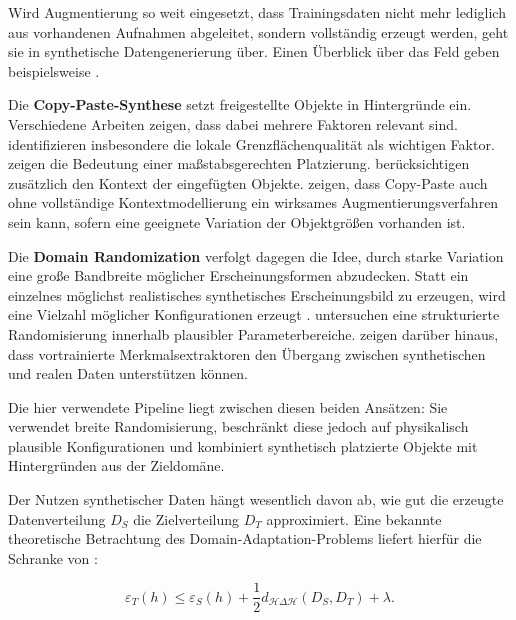 Wird Augmentierung so weit eingesetzt, dass Trainingsdaten nicht mehr lediglich aus vorhandenen Aufnahmen abgeleitet, sondern vollständig erzeugt werden, geht sie in synthetische Datengenerierung über. Einen Überblick über das Feld geben beispielsweise \textcite{nikolenko2021}.

Die \textbf{Copy-Paste-Synthese} setzt freigestellte Objekte in Hintergründe ein. Verschiedene Arbeiten zeigen, dass dabei mehrere Faktoren relevant sind. \textcite{dwibedi2017} identifizieren insbesondere die lokale Grenzflächenqualität als wichtigen Faktor. \textcite{georgakis2017} zeigen die Bedeutung einer maßstabsgerechten Platzierung. \textcite{dvornik2018} berücksichtigen zusätzlich den Kontext der eingefügten Objekte. \textcite{ghiasi2021} zeigen, dass Copy-Paste auch ohne vollständige Kontextmodellierung ein wirksames Augmentierungsverfahren sein kann, sofern eine geeignete Variation der Objektgrößen vorhanden ist.

Die \textbf{Domain Randomization} verfolgt dagegen die Idee, durch starke Variation eine große Bandbreite möglicher Erscheinungsformen abzudecken. Statt ein einzelnes möglichst realistisches synthetisches Erscheinungsbild zu erzeugen, wird eine Vielzahl möglicher Konfigurationen erzeugt \parencite{tobin2017,tremblay2018}. \textcite{prakash2019} untersuchen eine strukturierte Randomisierung innerhalb plausibler Parameterbereiche. \textcite{hinterstoisser2018} zeigen darüber hinaus, dass vortrainierte Merkmalsextraktoren den Übergang zwischen synthetischen und realen Daten unterstützen können.

Die hier verwendete Pipeline liegt zwischen diesen beiden Ansätzen: Sie verwendet breite Randomisierung, beschränkt diese jedoch auf physikalisch plausible Konfigurationen und kombiniert synthetisch platzierte Objekte mit Hintergründen aus der Zieldomäne.


Der Nutzen synthetischer Daten hängt wesentlich davon ab, wie gut die erzeugte Datenverteilung $D_S$ die Zielverteilung $D_T$ approximiert. Eine bekannte theoretische Betrachtung des Domain-Adaptation-Problems liefert hierfür die Schranke von \textcite{bendavid2010}:

\begin{equation}
\varepsilon_T(h)
\leq
\varepsilon_S(h)
+
\frac{1}{2}
d_{\mathcal{H}\Delta\mathcal{H}}(D_S,D_T)
+
\lambda.
\label{eq:bendavid}
\end{equation}

